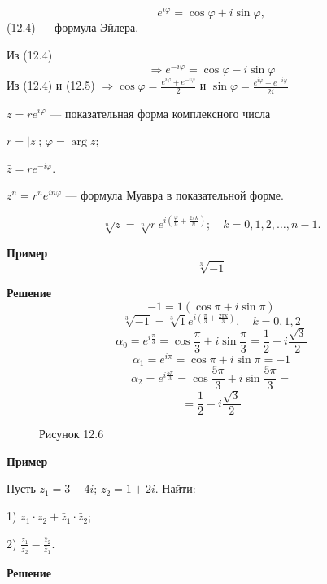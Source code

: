 \documentclass[12pt,a4paper]{article}
\begin{document}
\begin{equation}
e^{i\varphi}=\cos\varphi+i\sin\varphi, \tag{12.4}
\end{equation}
(12.4) --- формула Эйлера.

Из (12.4)
\begin{equation}
\Rightarrow e^{-i\varphi}=\cos\varphi-i\sin\varphi \tag{12.5}
\end{equation}
Из (12.4) и (12.5) $\Rightarrow
\cos\varphi=\frac{e^{i\varphi}+e^{-i\varphi}}{2}$ и
$\sin\varphi=\frac{e^{i\varphi}-e^{-i\varphi}}{2i}$

$z=re^{i\varphi}$ --- показательная форма комплексного числа

$r=|z|$; $\varphi=\arg z$;

$\bar z=re^{-i\varphi}$.

$z^n=r^ne^{in\varphi}$ --- формула Муавра в показательной форме.

$$
\sqrt[n]{z}=\sqrt[n]{r}e^{i\left(\frac{\varphi}{n}+\frac{2\pi
k}{n}\right)};\quad k=0,1,2,\ldots,n-1.
$$

\textbf{Пример}
$$
\sqrt[3]{-1}
$$

\textbf{Решение}
$$
-1=1(\cos\pi+i\sin\pi)
$$
$$
\sqrt[3]{-1}=\sqrt[3]{1}e^{i\left(\frac{\pi}{3}+\frac{2\pi
k}{3}\right)},\quad k=0,1,2
$$
$$
\alpha_0=e^{i\frac{\pi}{3}}=\cos\frac{\pi}{3}+i\sin\frac{\pi}{3}=\frac12+i\frac{\sqrt3}{2}
$$
$$
\alpha_1=e^{i\pi}=\cos\pi+i\sin\pi=-1
$$
$$
\alpha_2=e^{i\frac{5\pi}{3}}=\cos\frac{5\pi}{3}+i\sin\frac{5\pi}{3}=
$$
$$
=\frac12-i\frac{\sqrt3}{2}
$$

\begin{figure}[H]
\centering
{}
\caption*{Рисунок 12.6}
\end{figure}

\textbf{Пример}

Пусть $z_1=3-4i$; $z_2=1+2i$. Найти:

1) $z_1\cdot z_2+\bar z_1\cdot \bar z_2$;

2) $\frac{z_1}{z_2}-\frac{\bar z_2}{\bar z_1}$.

\textbf{Решение}
\end{document}
